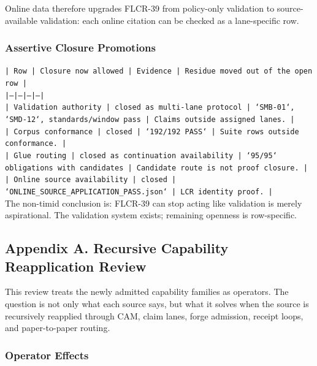 \documentclass[11pt]{article}
\begin{document}
Online data therefore upgrades FLCR-39 from policy-only validation to source-available validation: each online citation can be checked as a lane-specific row.

\subsubsection*{Assertive Closure Promotions}

\noindent\texttt{| Row | Closure now allowed | Evidence | Residue moved out of the open row |}\\
\noindent\texttt{|---|---|---|---|}\\
\noindent\texttt{| Validation authority | closed as multi-lane protocol | `SMB-01`, `SMD-12`, standards/window pass | Claims outside assigned lanes. |}\\
\noindent\texttt{| Corpus conformance | closed | `192/192 PASS` | Suite rows outside conformance. |}\\
\noindent\texttt{| Glue routing | closed as continuation availability | `95/95` obligations with candidates | Candidate route is not proof closure. |}\\
\noindent\texttt{| Online source availability | closed | `ONLINE\_SOURCE\_APPLICATION\_PASS.json` | LCR identity proof. |}\\

The non-timid conclusion is: FLCR-39 can stop acting like validation is merely aspirational. The validation system exists; remaining openness is row-specific.

\subsection*{Appendix A. Recursive Capability Reapplication Review}

This review treats the newly admitted capability families as operators. The question is not only what each source says, but what it solves when the source is recursively reapplied through CAM, claim lanes, forge admission, receipt loops, and paper-to-paper routing.

\subsubsection*{Operator Effects}
\end{document}
